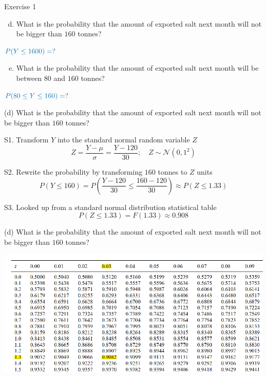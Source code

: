 \documentclass[
  11pt,
  ignorenonframetext,
]{beamer}
\providecommand{\tightlist}{%
  \setlength{\itemsep}{0pt}\setlength{\parskip}{0pt}}
\begin{document}
\begin{frame}{Exercise 1}
\protect\hypertarget{exercise-1-3}{}
\begin{enumerate}
[(a)]
\setcounter{enumi}{3}
\tightlist
\item
  What is the probability that the amount of exported salt next month
  will not be bigger than \(160\) tonnes?
\end{enumerate}

\quad\quad \(\color{blue}{P(Y \leq 1600) = ?}\)

\begin{enumerate}
[(a)]
\setcounter{enumi}{4}
\tightlist
\item
  What is the probability that the amount of exported salt next month
  will be between \(80\) and \(160\) tonnes?
\end{enumerate}

\quad\quad \(\color{blue}{P(80 \leq Y \leq 160) = ?}\)
\end{frame}

\begin{frame}{(d) What is the probability that the amount of exported
salt next month will not be bigger than \(160\) tonnes?}
\protect\hypertarget{d-what-is-the-probability-that-the-amount-of-exported-salt-next-month-will-not-be-bigger-than-160-tonnes}{}
\normalsize

S1. Transform \(Y\) into the standard normal random variable \(Z\)
\small \[
Z = \frac{Y - \mu}{\sigma} = \frac{Y - 120}{30}; \quad Z \sim \mathcal{N}(0,1^2)
\]

\normalsize

S2. Rewrite the probability by transforming \(160\) tonnes to \(Z\)
units \small \[
P(Y \leq 160) = P\left(\frac{Y - 120}{30} \leq \frac{160 - 120}{30}\right) \approx P\left(Z \leq 1.33\right)
\]

\normalsize

S3. Looked up from a standard normal distribution statistical table
\small \[
P\left(Z \leq 1.33\right) = F(1.33) \approx 0.908
\]
\end{frame}

\begin{frame}{(d) What is the probability that the amount of exported
salt next month will not be bigger than \(160\) tonnes?}
\protect\hypertarget{d-what-is-the-probability-that-the-amount-of-exported-salt-next-month-will-not-be-bigger-than-160-tonnes-1}{}
\begin{center}\includegraphics[width=0.9\linewidth]{pictures/Zat1.33} \end{center}
\end{frame}
\end{document}
